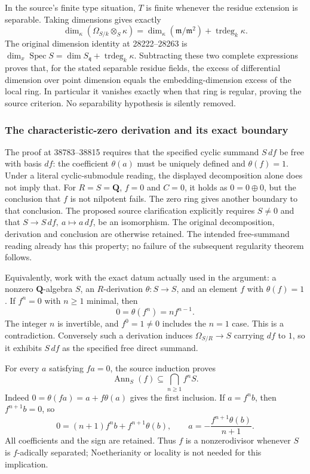 In the source's finite type situation, \(T\) is finite whenever the residue extension is separable. Taking dimensions gives exactly \[
\dim_\kappa(\Omega_{S/k}\otimes_S\kappa)
=\dim_\kappa(\mathfrak m/\mathfrak m^2)+\operatorname{trdeg}_k\kappa.
\] The original dimension identity at 28222--28263 is \(\dim_x\operatorname{Spec}S=\dim S_{\mathfrak q}+\operatorname{trdeg}_k\kappa\). Subtracting these two complete expressions proves that, for the stated separable residue fields, the excess of differential dimension over point dimension equals the embedding-dimension excess of the local ring. In particular it vanishes exactly when that ring is regular, proving the source criterion. No separability hypothesis is silently removed.

\subsubsection{The characteristic-zero derivation and its exact boundary}\label{algebra-proof-049-the-characteristic-zero-derivation-and-its-exact-boundary}

The proof at 38783--38815 requires that the specified cyclic summand \(S\,df\) be free with basis \(df\): the coefficient \(\theta(a)\) must be uniquely defined and \(\theta(f)=1\). Under a literal cyclic-submodule reading, the displayed decomposition alone does not imply that. For \(R=S=\mathbf Q\), \(f=0\) and \(C=0\), it holds as \(0=0\oplus0\), but the conclusion that \(f\) is not nilpotent fails. The zero ring gives another boundary to that conclusion. The proposed source clarification explicitly requires \(S\ne0\) and that \(S\to S\,df,\ a\mapsto a\,df\), be an isomorphism. The original decomposition, derivation and conclusion are otherwise retained. The intended free-summand reading already has this property; no failure of the subsequent regularity theorem follows.

Equivalently, work with the exact datum actually used in the argument: a nonzero \(\mathbf Q\)-algebra \(S\), an \(R\)-derivation \(\theta:S\to S\), and an element \(f\) with \(\theta(f)=1\). If \(f^n=0\) with \(n\ge1\) minimal, then \[
0=\theta(f^n)=n f^{n-1}.
\] The integer \(n\) is invertible, and \(f^0=1\ne0\) includes the \(n=1\) case. This is a contradiction. Conversely such a derivation induces \(\Omega_{S/R}\to S\) carrying \(df\) to \(1\), so it exhibits \(S\,df\) as the specified free direct summand.

For every \(a\) satisfying \(fa=0\), the source induction proves \[
\operatorname{Ann}_S(f)\subseteq\bigcap_{n\ge1}f^nS.
\] Indeed \(0=\theta(fa)=a+f\theta(a)\) gives the first inclusion. If \(a=f^n b\), then \(f^{n+1}b=0\), so \[
0=(n+1)f^n b+f^{n+1}\theta(b),\qquad
a=-\frac{f^{n+1}\theta(b)}{n+1}.
\] All coefficients and the sign are retained. Thus \(f\) is a nonzerodivisor whenever \(S\) is \(f\)-adically separated; Noetherianity or locality is not needed for this implication.

